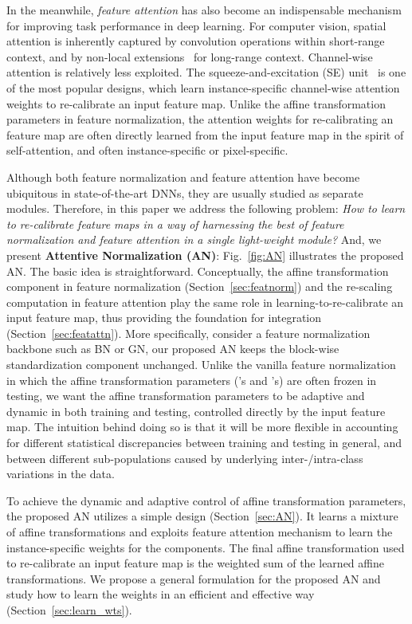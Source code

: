 \documentclass[runningheads]{llncs}
\begin{document}
In the meanwhile, \textit{feature attention} has also become an indispensable mechanism for improving task performance in deep learning. For computer vision, spatial attention is inherently captured by convolution operations within short-range context, and by non-local extensions~\cite{NonlocalNet,CrissCross} for long-range context. Channel-wise attention is relatively less exploited. The squeeze-and-excitation (SE) unit~\cite{SENet} is one of the most popular designs, which learn instance-specific channel-wise attention weights to re-calibrate an input feature map. Unlike the affine transformation parameters in feature normalization, the attention weights for re-calibrating an feature map are often directly learned from the input feature map in the spirit of self-attention, and often instance-specific or pixel-specific. 



Although both feature normalization  and feature attention  have become ubiquitous in state-of-the-art DNNs, they are usually studied as separate modules. Therefore, in this paper we address the following problem: 
\textit{How to learn to re-calibrate feature maps in a way of harnessing the best of feature normalization and feature attention in a single light-weight module?} 
And, we present \textbf{Attentive Normalization (AN)}: Fig.~\ref{fig:AN} illustrates the proposed AN. The basic idea is straightforward. Conceptually, the affine transformation component in feature normalization (Section~\ref{sec:featnorm}) and the re-scaling computation in feature attention  play the same role in learning-to-re-calibrate an input feature map, thus providing the foundation for integration (Section~\ref{sec:featattn}). More specifically, consider a feature normalization backbone such as BN or GN, our proposed AN keeps the block-wise standardization component unchanged. Unlike the vanilla feature normalization in which the affine transformation parameters ('s and 's) are often frozen in testing, we want the affine transformation parameters to be adaptive and dynamic in both training and testing,  controlled directly by the input feature map. The intuition behind doing so is that it will be more flexible in accounting for different statistical discrepancies between training and testing in general, and between different sub-populations caused by underlying inter-/intra-class variations in the data.   

To achieve the dynamic and adaptive control of affine transformation parameters, the proposed AN utilizes a simple design (Section~\ref{sec:AN}). It learns a mixture of  affine transformations and exploits feature attention mechanism to learn the instance-specific weights for the  components. The final affine transformation used to re-calibrate an input feature map is the weighted sum of the learned  affine transformations. We propose a general formulation for the proposed AN and study how to learn the weights in an efficient and effective way (Section~\ref{sec:learn_wts}). 
\end{document}
